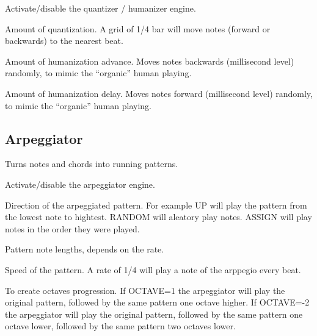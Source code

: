 
  

Activate/disable the quantizer / humanizer engine.

       

Amount of quantization. A grid of 1/4 bar will move notes (forward or backwards) to the nearest beat.

  \btn{\ldots} 

Amount of humanization advance. Moves notes backwards (millisecond level) randomly, to mimic the ``organic'' human playing.

  \btn{\ldots} 

Amount of humanization delay. Moves notes forward (millisecond level) randomly, to mimic the ``organic'' human playing.

\subsection{Arpeggiator}

Turns notes and chords into running patterns.


  

Activate/disable the arpeggiator engine.

     

Direction of the arpeggiated pattern. For example UP will play the pattern from the lowest note to hightest. RANDOM will aleatory play notes. ASSIGN will play notes in the order they were played.

  \btn{\ldots} 

Pattern note lengths, depends on the rate.

  \btn{\ldots} 

Speed of the pattern. A rate of 1/4 will play a note of the arppegio every beat.

  \btn{\ldots} 

To create octaves progression. If OCTAVE=1 the arpeggiator will play the original pattern, followed by the same pattern one octave higher. If OCTAVE=-2 the arpeggiator will play the original pattern, followed by the same pattern one octave lower, followed by the same pattern two octaves lower.

